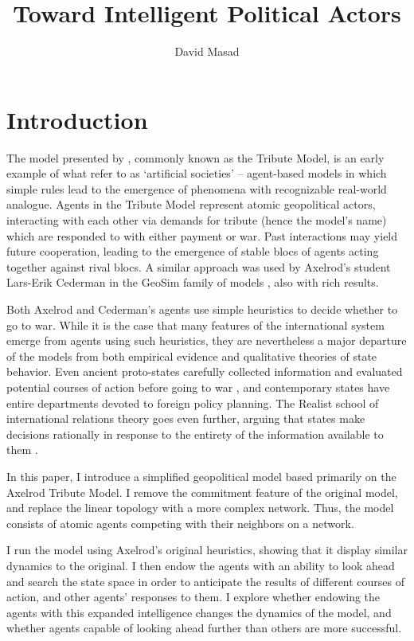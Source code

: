 \documentclass{article}
\begin{document}
\title{Toward Intelligent Political Actors}
	\author{David Masad}
	\maketitle
\onehalfspacing
\section{Introduction}
The model presented by \citet{axelrod_1997}, commonly known as the Tribute Model, is an early example of what \citet{epstein_1996} refer to as `artificial societies' -- agent-based models in which simple rules lead to the emergence of phenomena with recognizable real-world analogue. Agents in the Tribute Model represent atomic geopolitical actors, interacting with each other via demands for tribute (hence the model's name) which are responded to with either payment or war. Past interactions may yield future cooperation, leading to the emergence of stable blocs of agents acting together against rival blocs. A similar approach was used by Axelrod's student Lars-Erik Cederman in the GeoSim family of models \citep{cederman_2003}, also with rich results.

Both Axelrod and Cederman's agents use simple heuristics to decide whether to go to war. While it is the case that many features of the international system emerge from agents using such heuristics, they are nevertheless a major departure of the models from both empirical evidence and qualitative theories of state behavior. Even ancient proto-states carefully collected information and evaluated potential courses of action before going to war \citep{sheldon_1989}, and contemporary states have entire departments devoted to foreign policy planning. The Realist school of international relations theory goes even further, arguing that states make decisions rationally in response to the entirety of the information available to them \citep{waltz_2010}. 

In this paper, I introduce a simplified geopolitical model based primarily on the Axelrod Tribute Model. I remove the commitment feature of the original model, and replace the linear topology with a more complex network. Thus, the model consists of atomic agents competing with their neighbors on a network. 

I run the model using Axelrod's original heuristics, showing that it display similar dynamics to the original. I then endow the agents with an ability to look ahead and search the state space in order to anticipate the results of different courses of action, and other agents' responses to them. I explore whether endowing the agents with this expanded intelligence changes the dynamics of the model, and whether agents capable of looking ahead further than others are more successful. 
\end{document}
